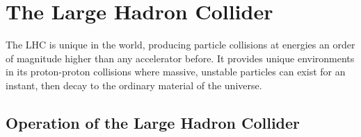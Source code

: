 
\chapter{The Large Hadron Collider} %

\label{ch:lhc} %


The \ac{LHC} is unique in the world, producing particle collisions at energies an order of magnitude higher than any accelerator before. It provides unique environments in its proton-proton collisions where massive, unstable particles can exist for an instant, then decay to the ordinary material of the universe.


\section{Operation of the Large Hadron Collider}

